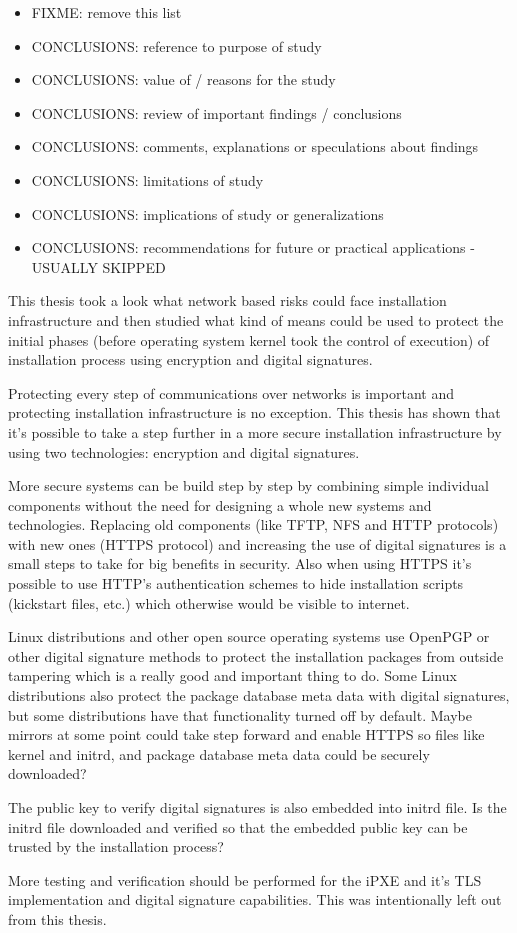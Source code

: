 
\begin{itemize}
\item FIXME: remove this list
\item CONCLUSIONS: reference to purpose of study
\item CONCLUSIONS: value of / reasons for the study
\item CONCLUSIONS: review of important findings / conclusions
\item CONCLUSIONS: comments, explanations or speculations about findings
\item CONCLUSIONS: limitations of study
\item CONCLUSIONS: implications of study or generalizations
\item CONCLUSIONS: recommendations for future or practical applications - USUALLY SKIPPED
\end{itemize}

This thesis took a look what network based risks could face
installation infrastructure and then studied what kind of means could
be used to protect the initial phases (before operating system kernel
took the control of execution) of installation process using
encryption and digital signatures.

Protecting every step of communications over networks is important and
protecting installation infrastructure is no exception. This thesis
has shown that it's possible to take a step further in a more secure
installation infrastructure by using two technologies: encryption and
digital signatures.

More secure systems can be build step by step by combining simple
individual components without the need for designing a whole new
systems and technologies. Replacing old components (like TFTP, NFS and
HTTP protocols) with new ones (HTTPS protocol) and increasing the use
of digital signatures is a small steps to take for big benefits in
security. Also when using HTTPS it's possible to use HTTP's
authentication schemes to hide installation scripts (kickstart files,
etc.) which otherwise would be visible to internet.

Linux distributions and other open source operating systems use
OpenPGP or other digital signature methods to protect the installation
packages from outside tampering which is a really good and important
thing to do. Some Linux distributions also protect the package
database meta data with digital signatures, but some distributions
have that functionality turned off by default. Maybe mirrors at some
point could take step forward and enable HTTPS so files like kernel
and initrd, and package database meta data could be securely
downloaded?

The public key to verify digital signatures is also embedded into
initrd file. Is the initrd file downloaded and verified so that the
embedded public key can be trusted by the installation process?

More testing and verification should be performed for the iPXE and
it's TLS implementation and digital signature capabilities. This was
intentionally left out from this thesis.
